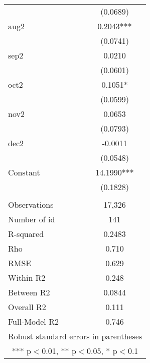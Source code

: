 \documentclass[]{article}
\begin{document}
\begin{tabular}{lc}
 & (0.0689) \\
aug2 & 0.2043*** \\
 & (0.0741) \\
sep2 & 0.0210 \\
 & (0.0601) \\
oct2 & 0.1051* \\
 & (0.0599) \\
nov2 & 0.0653 \\
 & (0.0793) \\
dec2 & -0.0011 \\
 & (0.0548) \\
Constant & 14.1990*** \\
 & (0.1828) \\
 &  \\
Observations & 17,326 \\
Number of id & 141 \\
R-squared & 0.2483 \\
Rho & 0.710 \\
RMSE & 0.629 \\
Within R2 & 0.248 \\
Between R2 & 0.0844 \\
Overall R2 & 0.111 \\
 Full-Model R2 & 0.746 \\ \hline
\multicolumn{2}{c}{ Robust standard errors in parentheses} \\
\multicolumn{2}{c}{ *** p$<$0.01, ** p$<$0.05, * p$<$0.1} \\
\end{tabular}
\end{document}
